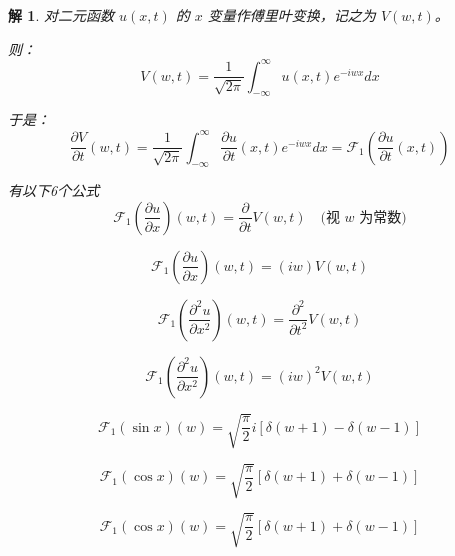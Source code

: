 \documentclass[12pt,a4paper]{article}
\numberwithin{subsection}{section}   %
\numberwithin{subsubsection}{subsection}
\theoremstyle{plain}
\newtheorem{solution}{解}[subsection]  %
\theoremstyle{definition}
\theoremstyle{remark}
\theoremstyle{remark}
\begin{document}
\begin{solution}
	对二元函数 \(u(x, t)\) 的 \(x\) 变量作傅里叶变换，记之为 \(V(w, t)\)。
	
	则：
	\begin{equation}
		V(w, t) = \frac{1}{\sqrt{2\pi}} \int_{-\infty}^{\infty} u(x, t) e^{-iwx} dx
	\end{equation}
	
	于是：
	\begin{equation}
		\frac{\partial V}{\partial t}(w, t) = \frac{1}{\sqrt{2\pi}} \int_{-\infty}^{\infty} \frac{\partial u}{\partial t}(x, t) e^{-iwx} dx = \mathcal{F}_1\left( \frac{\partial u}{\partial t}(x, t) \right)
	\end{equation}
	
	有以下6个公式
\begin{equation}
	\mathcal{F}_1\left( \frac{\partial u}{\partial x} \right)(w, t) = \frac{\partial}{\partial t} V(w, t) \quad \text{(视 \(w\) 为常数)}
\end{equation}

	
\begin{equation}
	\mathcal{F}_1\left( \frac{\partial u}{\partial x} \right)(w, t) = (iw) V(w, t)
\end{equation}

\begin{equation}
	\mathcal{F}_1\left( \frac{\partial^2 u}{\partial x^2} \right)(w, t) = \frac{\partial^2}{\partial t^2} V(w, t)
\end{equation}

\begin{equation}
	\mathcal{F}_1\left( \frac{\partial^2 u}{\partial x^2} \right)(w, t) = (iw)^2 V(w, t)
\end{equation}


\begin{equation}
	\mathcal{F}_1\left( \sin x \right)(w) = \sqrt{\frac{\pi}{2}} i \left[ \delta(w + 1) - \delta(w - 1) \right]
\end{equation}

\begin{equation}
	\mathcal{F}_1\left( \cos x \right)(w) = \sqrt{\frac{\pi}{2}} \left[ \delta(w + 1) + \delta(w - 1) \right]
\end{equation}
	
\end{solution}

\begin{equation}
	\mathcal{F}_1(\cos x)(w) = \sqrt{\frac{\pi}{2}} \left[ \delta(w + 1) + \delta(w - 1) \right]
\end{equation}
\end{document}
